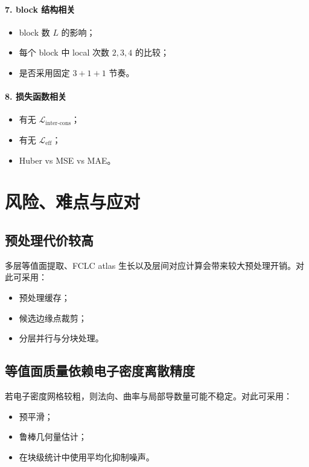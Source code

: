 \documentclass[12pt,a4paper]{ctexart}
\begin{document}
\paragraph{7. block 结构相关}
\begin{itemize}[leftmargin=2em]
    \item block 数 \(L\) 的影响；
    \item 每个 block 中 local 次数 \(2,3,4\) 的比较；
    \item 是否采用固定 \(3+1+1\) 节奏。
\end{itemize}

\paragraph{8. 损失函数相关}
\begin{itemize}[leftmargin=2em]
    \item 有无 \(\mathcal L_{\mathrm{inter\text{-}cons}}\)；
    \item 有无 \(\mathcal L_{\mathrm{eff}}\)；
    \item Huber vs MSE vs MAE。
\end{itemize}

\section{风险、难点与应对}

\subsection{预处理代价较高}
多层等值面提取、FCLC atlas 生长以及层间对应计算会带来较大预处理开销。对此可采用：
\begin{itemize}[leftmargin=2em]
    \item 预处理缓存；
    \item 候选边缘点裁剪；
    \item 分层并行与分块处理。
\end{itemize}

\subsection{等值面质量依赖电子密度离散精度}
若电子密度网格较粗，则法向、曲率与局部导数量可能不稳定。对此可采用：
\begin{itemize}[leftmargin=2em]
    \item 预平滑；
    \item 鲁棒几何量估计；
    \item 在块级统计中使用平均化抑制噪声。
\end{itemize}
\end{document}
